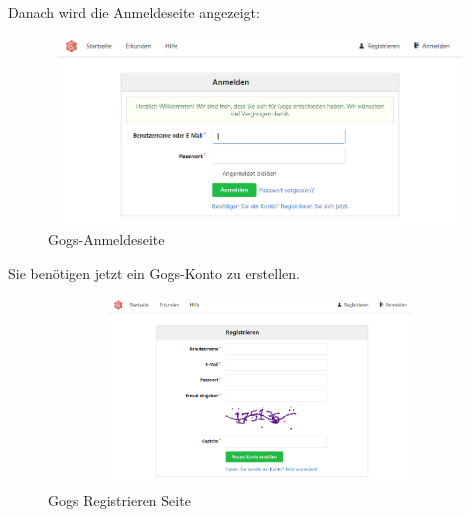 \documentclass[a4paper,12pt,oneside]{book}
\begin{document}
Danach wird die Anmeldeseite angezeigt:
\begin{figure}[h!]
	\begin{center}
		\includegraphics[width=17cm, height=5cm]{anmeldeseite.PNG}
		\caption{Gogs-Anmeldeseite} 
		\label{Anmeldeseite} 
	\end{center}
\end{figure}
\newline
Sie benötigen jetzt ein Gogs-Konto zu erstellen.
\begin{figure}[h!]
	\begin{center}
		\includegraphics[width=17cm, height=5cm]{gogs-registrieren-seite.PNG}
		\caption{Gogs Registrieren Seite} 
		\label{Gogs Registrieren Seite} 
	\end{center}
\end{figure}
\newpage
\end{document}
